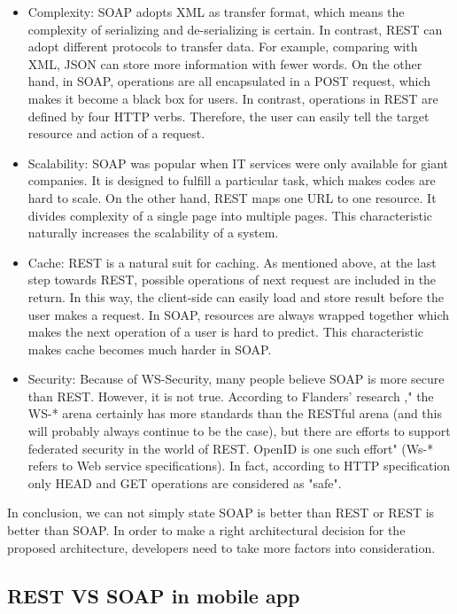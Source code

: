 \documentclass{Nan_Thesis}
\begin{document}
\begin{itemize}
  \item Complexity: SOAP adopts XML as transfer format, which means the complexity of serializing and de-serializing is certain. In contrast, REST can adopt different protocols to transfer data. For example, comparing with XML, JSON can store more information with fewer words. On the other hand, in SOAP, operations are all encapsulated in a POST request, which makes it become a black box for users. In contrast, operations in REST are defined by four HTTP verbs. Therefore, the user can easily tell the target resource and action of a request.
  \item Scalability: SOAP was popular when IT services were only available for giant companies. It is designed to fulfill a particular task, which makes codes are hard to scale. On the other hand, REST maps one URL to one resource. It divides complexity of a single page into multiple pages. This characteristic naturally increases the scalability of a system.
  \item Cache: REST is a natural suit for caching. As mentioned above, at the last step towards REST, possible operations of next request are included in the return. In this way, the client-side can easily load and store result before the user makes a request. In SOAP, resources are always wrapped together which makes the next operation of a user is hard to predict. This characteristic makes cache becomes much harder in SOAP.
  \item Security: Because of WS-Security, many people believe SOAP is more secure than REST. However, it is not true. According to Flanders’ research \cite{flanders2009moreonrest}," the WS-* arena certainly has more standards than the RESTful arena (and this will probably always continue to be the case), but there are efforts to support federated security in the world of REST. OpenID is one such effort" (Ws-* refers to Web service specifications). In fact, according to HTTP specification \cite{fielding1999hypertext} only HEAD and GET operations are considered as "safe".
\end{itemize}

In conclusion, we can not simply state SOAP is better than REST or REST is better than SOAP. In order to make a right architectural decision for the proposed architecture, developers need to take more factors into consideration.
\subsection{REST VS SOAP in mobile app}
\end{document}
